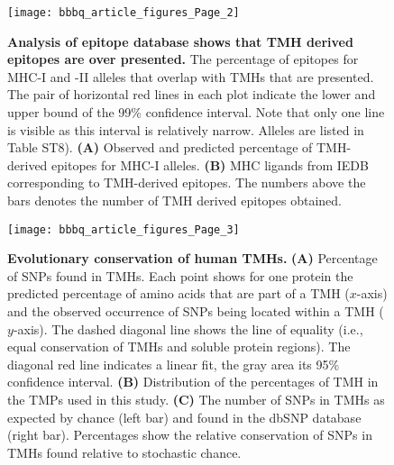 \documentclass[utf8]{frontiersSCNS} %
\begin{document}
%
%
\begin{figure}[h!]
\begin{center}
\texttt{[image: bbbq\_article\_figures\_Page\_2]}%
\end{center}
\caption{
    \textbf{
      Analysis of epitope database shows that TMH derived epitopes are over presented.
    }
    The percentage of epitopes for MHC-I and -II alleles that overlap with TMHs
    that are presented. The pair of horizontal red lines in each plot indicate the
    lower and upper bound of the 99\% confidence interval. Note that only one line
    is visible as this interval is relatively narrow. 
    Alleles are listed in Table ST8).
    \textbf{(A)} 
    Observed and predicted percentage of TMH-derived epitopes for MHC-I alleles. 
    \textbf{(B)} 
    MHC ligands from IEDB corresponding to TMH-derived epitopes. 
    The numbers above the bars denotes the number of TMH derived epitopes obtained.
}
\label{fig:2}
\end{figure}



%
%
\begin{figure}[h!]
\begin{center}
\texttt{[image: bbbq\_article\_figures\_Page\_3]}%
\end{center}
\caption{
    \textbf{Evolutionary conservation of human TMHs.}
    \textbf{(A)} 
    Percentage of SNPs found in TMHs.
    Each point shows for one protein the predicted percentage of
    amino acids that are part of a TMH ($x$-axis) and the observed occurrence of SNPs being located
    within a TMH ($y$-axis).
    The dashed diagonal line shows the line of equality (i.e.,
    equal conservation of TMHs and soluble protein regions). 
    The diagonal red line indicates a linear fit, 
    the gray area its 95\% confidence interval.
    \textbf{(B)}
    Distribution of the percentages of TMH in the TMPs used in this study.
    \textbf{(C)}
    The number of SNPs in TMHs as expected by chance (left bar) 
    and found in the dbSNP database (right bar).
    Percentages show the relative conservation
    of SNPs in TMHs found relative to stochastic chance.
}
\label{fig:3}
\end{figure}
\end{document}
